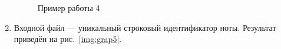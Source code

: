 \documentclass[12pt, a4paper]{article}
\begin{document}
\begin{enumerate}
\begin{figure}[h]
  		\caption{Пример работы 4}
  		\label{img:grap4}
	\end{figure}
	\newpage
	\item Входной файл --- уникальный строковый идентификатор ноты.
	Результат приведён на рис.~\ref{img:grap5}.
	\begin{figure}[h]

\end{figure}
\end{enumerate}
\end{document}
